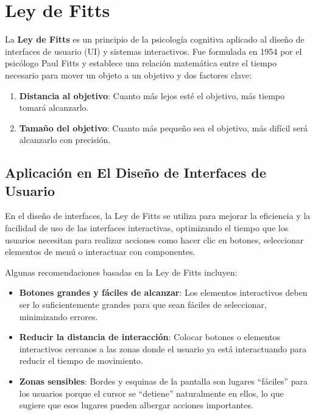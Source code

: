 	\clearpage
	\listoffigures



	\clearpage
	\vspace*{6pt}
	\begin{center}
		{\textbf{\huge \theTitle}}
	\end{center}
	\vspace*{8pt}

	\section{Ley de Fitts}

	La \textbf{Ley de Fitts} es un principio de la psicología cognitiva
	aplicado al diseño de interfaces de usuario (UI) y sistemas interactivos.
	Fue formulada en 1954 por el psicólogo Paul Fitts y establece una
	relación matemática entre el tiempo necesario para mover un objeto
	a un objetivo y dos factores clave:

	\begin{enumerate}
		\item \textbf{Distancia al objetivo}: Cuanto más lejos esté el objetivo,
			más tiempo tomará alcanzarlo.

		\item \textbf{Tamaño del objetivo}: Cuanto más pequeño sea el objetivo,
			más difícil será alcanzarlo con precisión.
	\end{enumerate}

	\subsection{Aplicación en El Diseño de Interfaces de Usuario}

	En el diseño de interfaces, la Ley de Fitts se utiliza para mejorar
	la eficiencia y la facilidad de uso de las interfaces interactivas,
	optimizando el tiempo que los usuarios necesitan para realizar
	acciones como hacer clic en botones, seleccionar elementos de menú o
	interactuar con componentes.

	Algunas recomendaciones basadas en la Ley de Fitts incluyen:

	\begin{itemize}
		\item \textbf{Botones grandes y fáciles de alcanzar}: Los elementos
			interactivos deben ser lo suficientemente grandes para que sean
			fáciles de seleccionar, minimizando errores.

		\item \textbf{Reducir la distancia de interacción}: Colocar botones
			o elementos interactivos cercanos a las zonas donde el usuario ya
			está interactuando para reducir el tiempo de movimiento.

		\item \textbf{Zonas sensibles}: Bordes y esquinas de la pantalla son
			lugares ``fáciles'' para los usuarios porque el cursor se ``detiene''
			naturalmente en ellos, lo que sugiere que esos lugares pueden
			albergar acciones importantes.
	\end{itemize}

